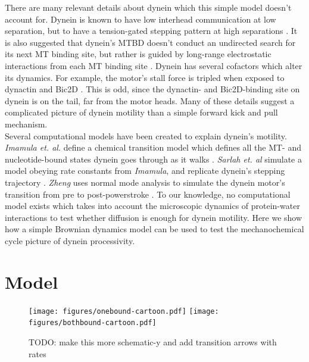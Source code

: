 \documentclass[9pt,twocolumn,twoside]{pnas-new}
\begin{document}
There are many relevant details about dynein which this simple model doesn't account for. Dynein is known to have low interhead communication at low separation, but to have a tension-gated stepping pattern at high separations \cite{yildizpaper}. It is also suggested that dynein's MTBD doesn't conduct an undirected search for its next MT binding site, but rather is guided by long-range electrostatic interactions from each MT binding site \cite{longrangemt}. Dynein has several cofactors which alter its dynamics. For example, the motor's stall force is tripled when exposed to dynactin and Bic2D \cite{yildizdynactin}. This is odd, since the dynactin- and Bic2D-binding site on dynein is on the tail, far from the motor heads. Many of these details suggest a complicated picture of dynein motility than a simple forward kick and pull mechanism.\\

Several computational models have been created to explain dynein's motility. \textit{Imamula et. al.} define a chemical transition model which defines all the MT- and nucleotide-bound states dynein goes through as it walks \cite{imamulamodel}. \textit{Sarlah et. al} simulate a model obeying rate constants from \textit{Imamula}, and replicate dynein's stepping trajectory \cite{sarlahmodel}. \textit{Zheng} uses normal mode analysis to simulate the dynein motor's transition from pre to post-powerstroke \cite{normalmodes}. To our knowledge, no computational model exists which takes into account the microscopic dynamics of protein-water interactions to test whether diffusion is enough for dynein motility. Here we show how a simple Brownian dynamics model can be used to test the mechanochemical cycle picture of dynein processivity.\\

\section*{Model}

\begin{figure}[tbhp]
\centering
\texttt{[image: figures/onebound-cartoon.pdf]}%
\texttt{[image: figures/bothbound-cartoon.pdf]}
\caption{TODO: make this more schematic-y and add transition arrows with rates}
\label{fig:model}
\end{figure}
\end{document}
